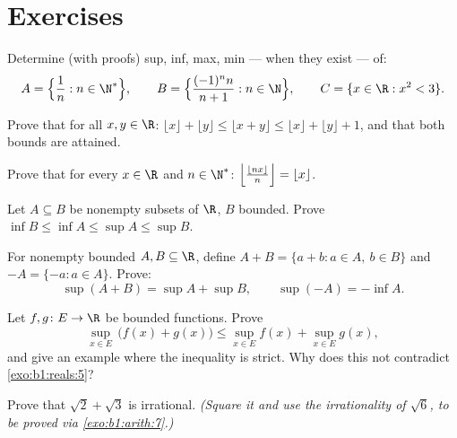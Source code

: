 \section{Exercises}

\begin{exercise}[$\star$]\label{exo:b1:reals:1}
Determine (with proofs) sup, inf, max, min --- when they exist --- of:
\[
A = \Bigl\{\frac{1}{n} : n \in \N^*\Bigr\},
\qquad
B = \Bigl\{\frac{(-1)^n n}{n+1} : n \in \N\Bigr\},
\qquad
C = \{x \in \R : x^2 < 3\}.
\]
\end{exercise}

\begin{exercise}[$\star$]\label{exo:b1:reals:2}
Prove that for all $x, y \in \R$: $\lfloor x \rfloor + \lfloor y
\rfloor \leq \lfloor x + y \rfloor \leq \lfloor x \rfloor + \lfloor y
\rfloor + 1$, and that both bounds are attained.
\end{exercise}

\begin{exercise}[$\star$]\label{exo:b1:reals:3}
Prove that for every $x \in \R$ and $n \in \N^*$:
$\Bigl\lfloor \frac{\lfloor nx \rfloor}{n} \Bigr\rfloor = \lfloor x
\rfloor$.
\end{exercise}

\begin{exercise}[$\star$]\label{exo:b1:reals:4}
Let $A \subseteq B$ be nonempty subsets of $\R$, $B$ bounded. Prove
$\inf B \leq \inf A \leq \sup A \leq \sup B$.
\end{exercise}

\begin{exercise}[$\star\star$]\label{exo:b1:reals:5}
For nonempty bounded $A, B \subseteq \R$, define $A + B = \{a + b : a
\in A,\ b \in B\}$ and $-A = \{-a : a \in A\}$. Prove:
\[
\sup(A + B) = \sup A + \sup B,
\qquad
\sup(-A) = -\inf A .
\]
\end{exercise}

\begin{exercise}[$\star\star$]\label{exo:b1:reals:6}
Let $f, g \colon E \to \R$ be bounded functions. Prove
\[
\sup_{x \in E}\, \bigl(f(x) + g(x)\bigr) \leq \sup_{x \in E} f(x) +
\sup_{x \in E} g(x),
\]
and give an example where the inequality is strict. Why does this not
contradict \cref{exo:b1:reals:5}?
\end{exercise}

\begin{exercise}[$\star\star$]\label{exo:b1:reals:7}
Prove that $\sqrt 2 + \sqrt 3$ is irrational. \emph{(Square it and
use the irrationality of $\sqrt 6$, to be proved via
\cref{exo:b1:arith:7}.)}
\end{exercise}


